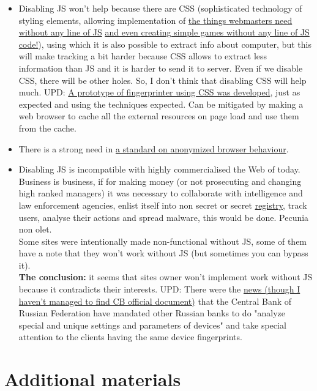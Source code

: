 \documentclass[letterpaper,14pt]{article}
\begin{document}
\begin{itemize}
\item
  Disabling JS won't help because there are CSS (sophisticated technology of styling elements, allowing implementation of \href{https://github.com/you-dont-need/You-Dont-Need-JavaScript}{the things webmasters need without any line of JS} \href{https://github.com/i0z/nojsgame}{and even creating simple games without any line of JS code!}), using which it is also possible to extract info about computer, but this will make tracking a bit harder because CSS allows to extract less information than JS and it is harder to send it to server. Even if we disable CSS, there will be other holes. So, I don't think that disabling CSS will help much.
  UPD: \href{https://github.com/jbtronics/CrookedStyleSheets}{A prototype of fingerprinter using CSS was developed}, just as expected and using the techniques expected. Can be mitigated by making a web browser to cache all the external resources on page load and use them from the cache.
\item
  There is a strong need in \href{https://trac.torproject.org/projects/tor/ticket/14310}{a standard on anonymized browser behaviour}.
\item
  Disabling JS is incompatible with highly commercialised the Web of today.\\
  Business is business, if for making money (or not prosecuting and changing high ranked managers) it was necessary to collaborate with intelligence and law enforcement agencies, enlist itself into non secret or secret \href{https://97-fz.rkn.gov.ru/}{registry}, track users, analyse their actions and spread malware, this would be done. Pecunia non olet.\\
  Some sites were intentionally made non-functional without JS, some of them have a note that they won't work without JS (but sometimes you can bypass it).\\
  \textbf{The conclusion:} it seems that sites owner won't implement work without JS because it contradicts their interests.
  UPD: There were the \href{https://www.vedomosti.ru/finance/articles/2018/06/21/773389-banki-proveryat-ustroistva}{news (though I haven't managed to find CB official document)} that the Central Bank of Russian Federation have mandated other Russian banks to do "analyze special and unique settings and parameters of devices" and take special attention to the clients having the same device fingerprints.
\end{itemize}

\section{Additional materials}\label{additional-materials}
\end{document}
